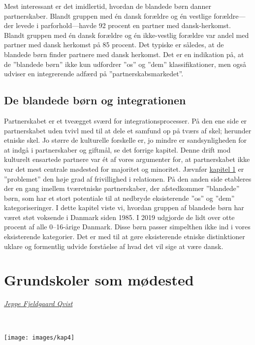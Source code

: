 \documentclass[
]{book}
\begin{document}
Mest interessant er det imidlertid, hvordan de blandede børn danner partnerskaber. Blandt gruppen med én dansk forældre og én vestlige forældre---der levede i parforhold---havde 92 procent en partner med dansk-herkomst. Blandt gruppen med én dansk forældre og én ikke-vestlig forældre var andel med partner med dansk herkomst på 85 procent. Det typiske er således, at de blandede børn finder partnere med dansk herkomst. Det er en indikation på, at de ''blandede børn'' ikke kun udfordrer ''os'' og ''dem'' klassifikationer, men også udviser en integrerende adfærd på ''partnerskabsmarkedet''.

\section{De blandede børn og integrationen}\label{de-blandede-buxf8rn-og-integrationen}

Partnerskabet er et tveægget sværd for integrationsprocesser. På den ene side er partnerskabet uden tvivl med til at dele et samfund op på tværs af skel; herunder etniske skel. Jo større de kulturelle forskelle er, jo mindre er sandsynligheden for at indgå i partnerskaber og giftmål, se det forrige kapitel. Denne drift mod kulturelt ensartede partnere var ét af vores argumenter for, at partnerskabet ikke var det mest centrale mødested for majoritet og minoritet. Jævnfør \hyperref[kap1]{kapitel 1} er ''problemet'' den høje grad af frivillighed i relationen. På den anden side etableres der en gang imellem tværetniske partnerskaber, der afstedkommer ''blandede'' børn, som har et stort potentiale til at nedbryde eksisterende ''os'' og ''dem'' kategoriseringer. I dette kapitel viste vi, hvordan gruppen af blandede børn har været støt voksende i Danmark siden 1985. I 2019 udgjorde de lidt over otte procent af alle 0--16-årige Danmark. Disse børn passer simpelthen ikke ind i vores eksisterende kategorier. Det er med til at gøre eksisterende etniske distinktioner uklare og formentlig udvide forståelse af hvad det vil sige at være dansk.

\chapter{Grundskoler som mødested}\label{kap4}

\emph{\href{https://vbn.aau.dk/da/persons/jeppefl}{Jeppe Fjeldgaard Qvist}}

~~~~

\texttt{[image: images/kap4]}

\newpage
\end{document}

